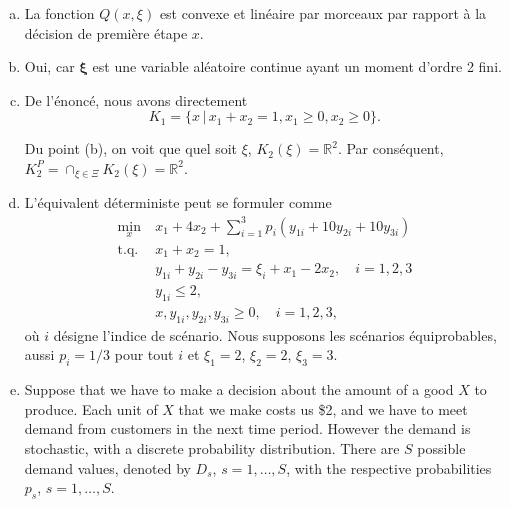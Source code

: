 \documentclass[12pt]{book}
\def\RR {\mathbb{R}}
\def\bxi {\boldsymbol{\xi}}
\def\RR {\mathbb{R}}
\begin{document}
\begin{enumerate}
\begin{enumerate}[(a)]
Considérons la valeur de $\xi + x_1 - 2 x_2$.
Si $\xi + x_1 - 2 x_2 < 0$, la seule solution extrême réalisable est 
$$
y_1 = y_2 = 0, \ y_3 = -\xi - x_1 + 2 x_2, \ y_4 = 2
$$
et est donc optimale.
Si $\xi + x_1 - 2 x_2 \geq 0$, nous devrons avoir pour un point extrême $y_3 = 0$, et nous avons
$$
y_1 + y_2 = \xi + x_1 - 2 x_2,\ y_1 \leq 2.
$$
Comme le coefficient de coût de $y_1$ est 1, et celui de $y_2$ est 10, il suit que $y_1$ devrait être choisi comme
$$
y_1 = \min \{ \xi + x_1 - 2 x_2, 2 \}.
$$
Nous avons donc deux cas à discuter: $\xi + x_1 - 2 x_2 \leq 2$ et $\xi + x_1 - 2 x_2 \geq 2$.
Si $\xi + x_1 - 2 x_2 \leq 2$, nous aurons
$$
y_1 = \xi + x_1 - 2 x_2,\ y_2 = 0,
$$
tandis $\xi + x_1 - 2 x_2 \geq 2$,
$$
y_1 = 2,\ y_2 = \xi + x_1 - 2 x_2 - 2,
$$
comme escompté.

\item

La fonction $Q(x, \xi)$ est convexe et linéaire par morceaux par rapport à la décision de première étape $x$.

\item 

Oui, car $\bxi$ est une variable aléatoire continue ayant un moment d'ordre 2 fini.

\item

De l'énoncé, nous avons directement
$$
K_1 = \{ x \,|\, x_1+x_2 = 1, x_1 \geq 0, x_2 \geq 0 \}.
$$

Du point (b), on voit que quel soit $\xi$, $K_2(\xi) = \RR^2$. Par conséquent, $K_2^P = \cap_{\xi \in \Xi} K_2(\xi) = \RR^2$.

\item

L'équivalent déterministe peut se formuler comme
\begin{align*}
\min_x \ & x_1 + 4 x_2 + \sum_{i=1}^3 p_i (y_{1i}+10y_{2i}+10y_{3i}) \\
\mbox{t.q. } & x_1 + x_2 = 1,\\
& y_{1i} + y_{2i} - y_{3i} = \xi_i + x_1 - 2 x_2, \quad i = 1,2,3\\
& y_{1i} \leq 2,\\
& x, y_{1i}, y_{2i}, y_{3i} \geq 0, \quad i = 1,2,3,
\end{align*}
où $i$ désigne l'indice de scénario.
Nous supposons les scénarios équiprobables, aussi $p_i = 1/3$ pour tout $i$ et $\xi_1 = 2$, $\xi_2 = 2$, $\xi_3 = 3$.

\item

Suppose that we have to make a decision about the amount of a good $X$ to
produce.
Each unit of $X$ that we make costs us \$2, and we have to meet demand from customers in the next time period.
However the demand is stochastic, with a discrete probability distribution. There are $S$ possible demand values, denoted by $D_s$, $s = 1,\ldots,S$, with the respective probabilities $p_s$, $s = 1,\ldots,S$.


\end{enumerate}
\end{enumerate}
\end{document}

